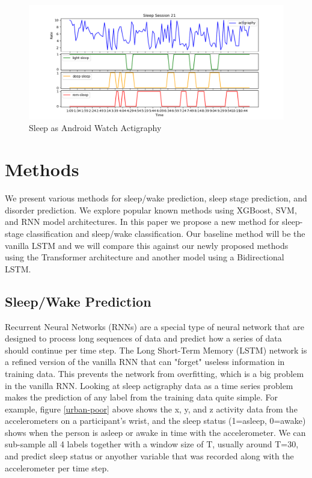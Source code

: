 \documentclass[12pt]{report}
\begin{document}
\begin{figure}
  \begin{center}
    \includegraphics[width=1\linewidth]{REM_NREM_labels}
    \caption{Sleep as Android Watch Actigraphy}
    \label{sleep-android}
  \end{center}
\end{figure}

\chapter{Methods}

We present various methods for sleep/wake prediction, sleep stage prediction, and disorder prediction. We explore popular known methods using XGBoost, SVM, and RNN model architectures. In this paper we propose a new method for sleep-stage classification and sleep/wake classification. Our baseline method will be the vanilla LSTM and we will compare this against our newly proposed methods using the Transformer architecture and another model using a Bidirectional LSTM. 

\section{Sleep/Wake Prediction}
Recurrent Neural Networks (RNNs) are a special type of neural network that are designed to process long sequences of data and predict how a series of data should continue per time step. The Long Short-Term Memory (LSTM) network is a refined version of the vanilla RNN that can "forget" useless information in training data. This prevents the network from overfitting, which is a big problem in the vanilla RNN. Looking at sleep actigraphy data as a time series problem makes the prediction of any label from the training data quite simple. For example, figure \ref{urban-poor} above shows the x, y, and z activity data from the accelerometers on a participant's wrist, and the sleep status (1=asleep, 0=awake) shows when the person is asleep or awake in time with the accelerometer. We can sub-sample all 4 labels together with a window size of T, usually around T=30, and predict sleep status or anyother variable that was recorded along with the accelerometer per time step. 
\end{document}
